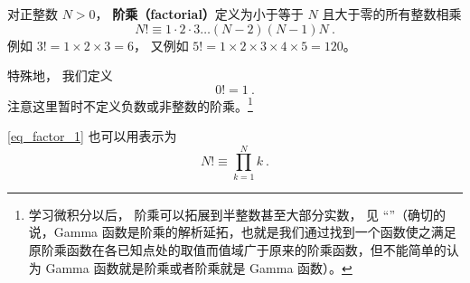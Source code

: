 
\begin{issues}
\issueDraft
\end{issues}


对正整数 $N > 0$， \textbf{阶乘（factorial）}定义为小于等于 $N$ 且大于零的所有整数相乘
\begin{equation}\label{eq_factor_1}
N! \equiv 1 \cdot 2 \cdot 3 \dots (N - 2) (N - 1)N~.
\end{equation}
例如 $3! = 1\times 2\times 3 = 6$， 又例如 $5! = 1\times 2\times 3\times 4\times 5 = 120$。

特殊地， 我们定义
\begin{equation}
0! = 1~.
\end{equation}
注意这里暂时不定义负数或非整数的阶乘。\footnote{学习微积分以后， 阶乘可以拓展到半整数甚至大部分实数， 见 “”（确切的说，Gamma 函数是阶乘的解析延拓，也就是我们通过找到一个函数使之满足原阶乘函数在各已知点处的取值而值域广于原来的阶乘函数，但不能简单的认为 Gamma 函数就是阶乘或者阶乘就是 Gamma 函数）。}

\autoref{eq_factor_1} 也可以用表示为
\begin{equation}
N! \equiv \prod_{k = 1}^N k~.
\end{equation}
